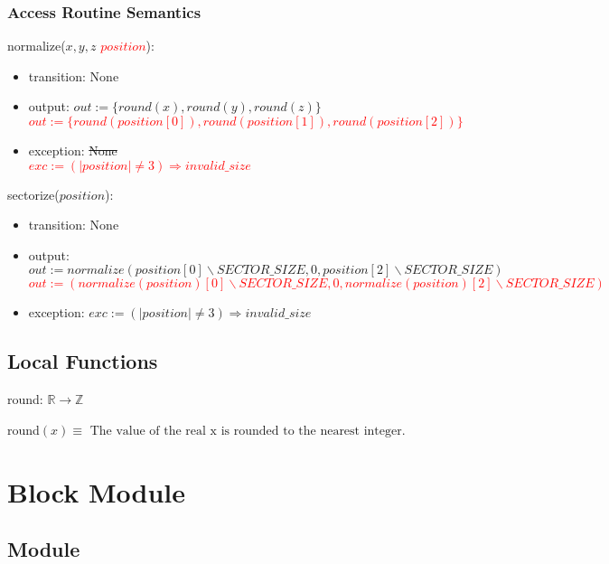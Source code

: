\documentclass[12pt]{article}
\begin{document}
\subsubsection* {Access Routine Semantics}

\noindent normalize(\sout{$x, y, z$} \textcolor{red}{ $ position$}):
\begin{itemize}
\item transition: None
\item output: \sout{$out := \{ round(x), round(y), round(z) \}$}\\
\textcolor{red}{$out := \{ round(position[0]), round(position[1]), round(position[2]) \}$}
\item exception: \sout{None}\\
\textcolor{red}{$ exc := (|position| \neq 3) \Rightarrow invalid\_size $}
\end{itemize}

\noindent sectorize($position$):
\begin{itemize}
\item transition: None
\item output: \sout{$out := normalize(position[0] \backslash SECTOR\_SIZE, 0,
position[2] \backslash SECTOR\_SIZE  )$}\\
\textcolor{red}{$out := (normalize(position)[0] \backslash SECTOR\_SIZE, 0,
normalize(position)[2] \backslash SECTOR\_SIZE  )$}
\item exception: $ exc := (|position| \neq 3) \Rightarrow invalid\_size $\\
\end{itemize}

\subsection*{Local Functions}

round: $\mathbb{R} \rightarrow \mathbb{Z}$

\noindent round$(x) \equiv$
\medskip
$ \mbox{The value of the real x is rounded to the nearest integer.}$\\
\medskip
\newpage

\section* {Block Module}

\subsection*{Module}
\end{document}
